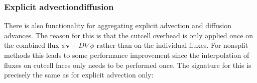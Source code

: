 \documentclass[letterpaper,10pt,english]{sphinxmanual}
\begin{document}
\begin{sphinxVerbatim}[commandchars=\\\{\},formatcom=\scriptsize]
 

    

         
    
          
                  
\end{sphinxVerbatim}


\subsubsection{Explicit advection\sphinxhyphen{}diffusion}
\label{\detokenize{Solvers/CDR:explicit-advection-diffusion}}\label{\detokenize{Solvers/CDR:chap-explicitadvectiondiffusion}}
There is also functionality for aggregating explicit advection and diffusion advances.
The reason for this is that the cut\sphinxhyphen{}cell overhead is only applied once on the combined flux \(\phi\mathbf{v} - D\nabla\phi\) rather than on the individual fluxes.
For non\sphinxhyphen{}split methods this leads to some performance improvement since the interpolation of fluxes on cut\sphinxhyphen{}cell faces only needs to be performed once.
The signature for this is precisely the same as for explicit advection only:

\begin{sphinxVerbatim}[commandchars=\\\{\},formatcom=\scriptsize]
        
\end{sphinxVerbatim}
\end{document}
